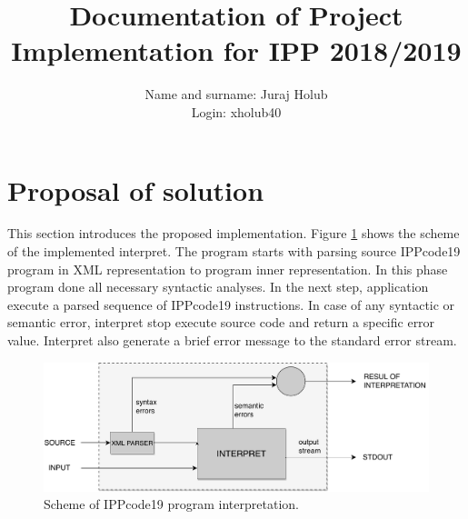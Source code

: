 \documentclass[a4paper, 10pt]{article}
\title{Documentation of Project Implementation for IPP 2018/2019 }
\author{Name and surname: Juraj Holub\\ Login: xholub40}
\date{}
\begin{document}
	\maketitle
	\thispagestyle{empty}

\section{Proposal of solution} \label{proposal}

    This section introduces the proposed implementation. Figure \ref{obr1} shows the scheme of the implemented interpret. The program starts with parsing source IPPcode19 program in XML representation to program inner representation. In this phase program done all necessary syntactic analyses. In the next step, application execute a parsed sequence of IPPcode19 instructions. In case of any syntactic or semantic error, interpret stop execute source code and return a specific error value. Interpret also generate a brief error message to the standard error stream.

\begin{figure}[H] 
	\centering
	\includegraphics[width=.5 \paperwidth]{interpret.pdf}
	\caption{Scheme of IPPcode19 program interpretation.}
	\label{obr1}
\end{figure} 
\end{document}
